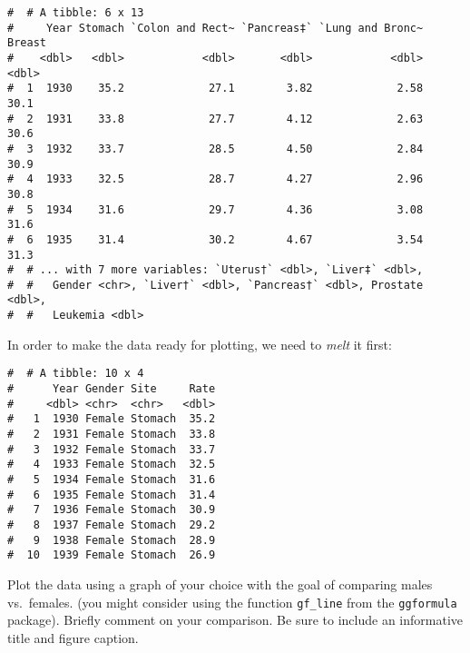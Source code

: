 \documentclass[letterpaper,9pt,twoside,printwatermark=false]{pinp}
\begin{document}
\begin{ShadedResult}
\begin{verbatim}
#  # A tibble: 6 x 13
#     Year Stomach `Colon and Rect~ `Pancreas‡` `Lung and Bronc~ Breast
#    <dbl>   <dbl>            <dbl>       <dbl>            <dbl>  <dbl>
#  1  1930    35.2             27.1        3.82             2.58   30.1
#  2  1931    33.8             27.7        4.12             2.63   30.6
#  3  1932    33.7             28.5        4.50             2.84   30.9
#  4  1933    32.5             28.7        4.27             2.96   30.8
#  5  1934    31.6             29.7        4.36             3.08   31.6
#  6  1935    31.4             30.2        4.67             3.54   31.3
#  # ... with 7 more variables: `Uterus†` <dbl>, `Liver‡` <dbl>,
#  #   Gender <chr>, `Liver†` <dbl>, `Pancreas†` <dbl>, Prostate <dbl>,
#  #   Leukemia <dbl>
\end{verbatim}
\end{ShadedResult}

In order to make the data ready for plotting, we need to \emph{melt} it
first:

\begin{Shaded}
\begin{Highlighting}[]
\StringTok{ }\OperatorTok{::} \NormalTok{, } \NormalTok{, }\OperatorTok{-}\OperatorTok{-}
 \NormalTok{)}
\end{Highlighting}
\end{Shaded}

\begin{ShadedResult}
\begin{verbatim}
#  # A tibble: 10 x 4
#      Year Gender Site     Rate
#     <dbl> <chr>  <chr>   <dbl>
#   1  1930 Female Stomach  35.2
#   2  1931 Female Stomach  33.8
#   3  1932 Female Stomach  33.7
#   4  1933 Female Stomach  32.5
#   5  1934 Female Stomach  31.6
#   6  1935 Female Stomach  31.4
#   7  1936 Female Stomach  30.9
#   8  1937 Female Stomach  29.2
#   9  1938 Female Stomach  28.9
#  10  1939 Female Stomach  26.9
\end{verbatim}
\end{ShadedResult}

Plot the data using a graph of your choice with the goal of comparing
males vs.~females. (you might consider using the function
\texttt{gf\_line} from the \texttt{ggformula} package). Briefly comment
on your comparison. Be sure to include an informative title and figure
caption.
\end{document}
